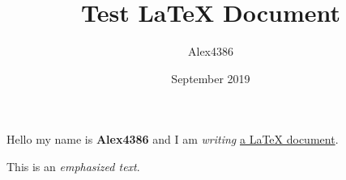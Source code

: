 \documentclass[12pt, letterpaper]{article}
\title{Test LaTeX Document}
\author{Alex4386}
\date{September 2019}
\begin{document}
\maketitle
Hello my name is \textbf{Alex4386} and I am \textit{writing} \underline{a \LaTeX{} document}.

This is an \emph{emphasized text}.
\end{document}
